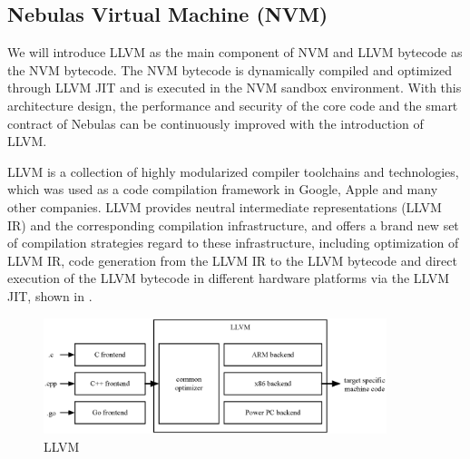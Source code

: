 \subsection{Nebulas Virtual Machine (NVM)}
\label{sec:nvm}

We will introduce LLVM \cite{llvm} as the main component of NVM and
LLVM bytecode as the NVM bytecode. The NVM bytecode is dynamically
compiled and optimized through LLVM JIT and is executed in the NVM sandbox environment. With this architecture design, the performance and security of the core code and the smart contract of Nebulas can be continuously improved with the introduction of LLVM. 


LLVM is a collection of highly modularized compiler toolchains and
technologies, which was used as a code compilation framework in Google, Apple
and many other companies. LLVM provides neutral intermediate representations
(LLVM IR) and the corresponding compilation infrastructure, and offers a brand
new set of compilation strategies regard to these infrastructure, including
optimization of LLVM IR, code generation from the LLVM IR to the LLVM bytecode
and direct execution of the LLVM bytecode in different hardware platforms via
the LLVM JIT, shown in . \\


\begin{figure}[h]
\centering
\includegraphics[width=10cm]{./figs/llvm}
\caption{LLVM}
\label{fig:llvm}
\end{figure}

